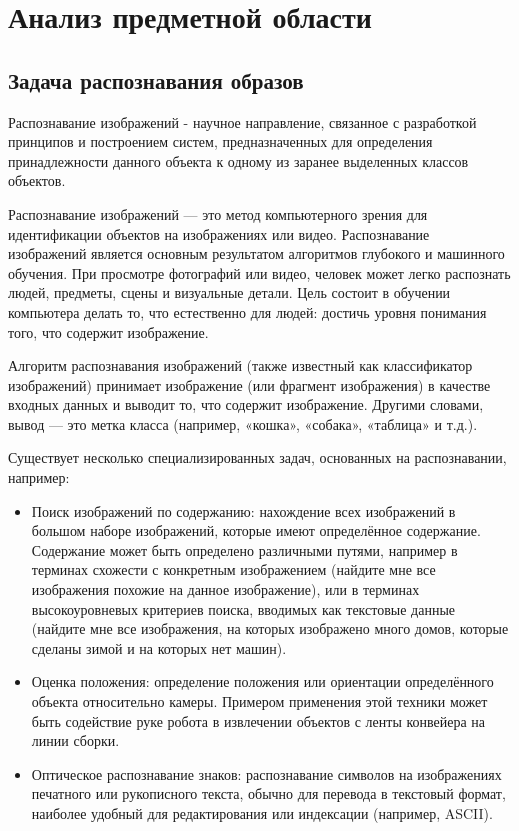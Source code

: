 \chapter{Анализ предметной области}

\section{Задача распознавания образов}

Распознавание изображений - научное направление, связанное с разработкой принципов и построением систем, предназначенных для определения принадлежности данного объекта к одному из заранее выделенных классов объектов.

Распознавание изображений — это метод компьютерного зрения для идентификации объектов на изображениях или видео. Распознавание изображений является основным результатом алгоритмов глубокого и машинного обучения. При просмотре фотографий или видео, человек может легко распознать людей, предметы, сцены и визуальные детали. Цель состоит в обучении компьютера делать то, что естественно для людей: достичь уровня понимания того, что содержит изображение.

Алгоритм распознавания изображений (также известный как классификатор изображений) принимает изображение (или фрагмент изображения) в качестве входных данных и выводит то, что содержит изображение. Другими словами, вывод — это метка класса (например, «кошка», «собака», «таблица» и т.д.).

Существует несколько специализированных задач, основанных на распознавании, например:
\begin{itemize}
	\item Поиск изображений по содержанию: нахождение всех изображений в большом наборе изображений, которые имеют определённое содержание. Содержание может быть определено различными путями, например в терминах схожести с конкретным изображением (найдите мне все изображения похожие на данное изображение), или в терминах высокоуровневых критериев поиска, вводимых как текстовые данные (найдите мне все изображения, на которых изображено много домов, которые сделаны зимой и на которых нет машин).
	\item Оценка положения: определение положения или ориентации определённого объекта относительно камеры. Примером применения этой техники может быть содействие руке робота в извлечении объектов с ленты конвейера на линии сборки.
	\item Оптическое распознавание знаков: распознавание символов на изображениях печатного или рукописного текста, обычно для перевода в текстовый формат, наиболее удобный для редактирования или индексации (например, ASCII).
\end{itemize}
